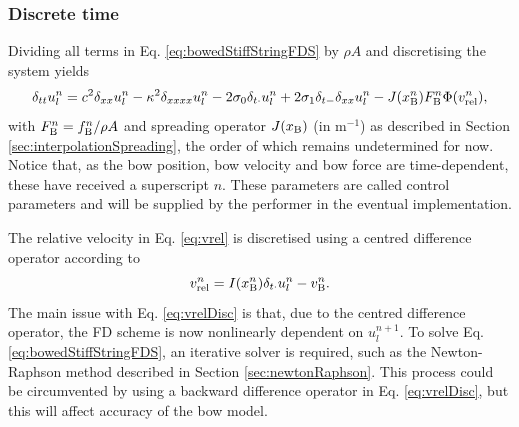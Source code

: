 \subsubsection{Discrete time}
Dividing all terms in Eq. \eqref{eq:bowedStiffStringFDS} by $\rho A$ and discretising the system yields
%
\begin{equation}\label{eq:bowedStiffStringFDS}
    \delta_{tt} u_l^n = c^2 \delta_{xx} u_l^n - \kappa^2 \delta_{xxxx} u_l^n - 2 \sigma_{0} \delta_{t\cdot} u_l^n + 2 \sigma_{1}\delta_{t-}\delta_{xx} u_l^n - J(x_{\text{B}}^n)F_{\text{B}}^n\Phi(v_\text{rel}^n),
\end{equation}
with $F_{\text{B}}^n = f_{\text{B}}^n/\rho A$ and spreading operator $J(x_{\text{B}})$ (in m$^{-1}$) as described in Section \ref{sec:interpolationSpreading}, the order of which remains undetermined for now. Notice that, as the bow position, bow velocity and bow force are time-dependent, these have received a superscript $n$. These parameters are called control parameters and will be supplied by the performer in the eventual implementation.

The relative velocity in Eq. \eqref{eq:vrel} is discretised using a centred difference operator according to
\begin{equation}\label{eq:vrelDisc}
    v_\text{rel}^n = I(x_{\text{B}}^n)\delta_{t\cdot} u_l^n - v_{\text{B}}^n.
\end{equation}
The main issue with Eq. \eqref{eq:vrelDisc} is that, due to the centred difference operator, the FD scheme is now nonlinearly dependent on $u_l^{n+1}$. To solve Eq. \eqref{eq:bowedStiffStringFDS}, an iterative solver is required, such as the Newton-Raphson method described in Section \ref{sec:newtonRaphson}. This process could be circumvented by using a backward  difference operator in Eq. \eqref{eq:vrelDisc}, but this will affect accuracy of the bow model.

